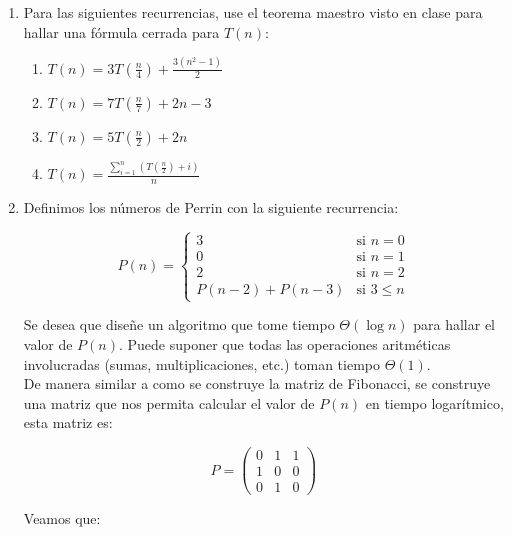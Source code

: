\documentclass[letterpaper, 12pt]{article}
\begin{document}
\begin{enumerate}


\item Para las siguientes recurrencias, use el teorema maestro visto en clase para hallar una fórmula cerrada para $T(n)$:

\begin{enumerate}
    \item $T(n) = 3T(\frac{n}{4}) + \frac{3(n^2 - 1)}{2}$
    \item $T(n) = 7T(\frac{n}{7}) + 2n - 3$
    \item $T(n) = 5T(\frac{n}{2}) + 2n$
    \item $T(n) = \frac{\sum_{i=1}^n (T(\frac{n}{2}) + i)}{n}$
\end{enumerate}


\item Definimos los números de Perrin con la siguiente recurrencia:

\[
P(n) =
\begin{cases}
    3 & \text{si } n = 0 \\
    0 & \text{si } n = 1 \\
    2 & \text{si } n = 2 \\
    P(n - 2) + P(n - 3) & \text{si } 3 \leq n
\end{cases}
\]

Se desea que diseñe un algoritmo que tome tiempo $\Theta(\log n)$ para hallar el valor de $P(n)$. Puede suponer que todas las operaciones aritméticas involucradas (sumas, multiplicaciones, etc.) toman tiempo $\Theta(1)$. \\

De manera similar a como se construye la matriz de Fibonacci, se construye una matriz que nos permita calcular el valor de $P(n)$ en tiempo logarítmico, esta matriz es:

\begin{equation*}
    P =
\begin{pmatrix}
        0 & 1 & 1 \\
        1 & 0 & 0 \\
        0 & 1 & 0
\end{pmatrix}
\end{equation*}

Veamos que:


\end{enumerate}
\end{document}
